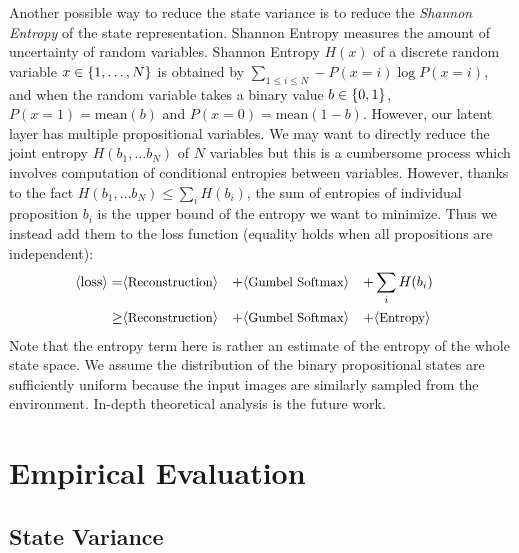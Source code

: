 Another possible way to reduce the state variance is to reduce the
\emph{Shannon Entropy} of the state representation.
Shannon Entropy measures the amount of uncertainty of random variables.
% 
Shannon Entropy $H(x)$ of a discrete random variable $x\in
{\left\{1,\ldots,N\right\}}$ is obtained by $\sum_{1\leq i \leq N} -P(x=i)\log
P(x=i)$, and when the random variable takes a binary value
$b\in{\left\{0,1\right\}}$, $P(x=1)=\text{mean}(b)$ and $P(x=0)=\text{mean}(1-b)$.
% 
However, our latent layer has multiple
propositional variables. 
We may want to directly reduce the joint entropy
$H(b_1,\ldots b_N)$ of $N$ variables but this is a cumbersome process which involves
computation of conditional entropies between variables.
However, thanks to the fact $H(b_1,\ldots b_N) \leq \sum_{i} H(b_i)$,
the sum of entropies of individual proposition $b_i$ is the upper bound of the entropy we want to minimize.
Thus we instead add them to the loss function (equality holds when all propositions are independent):
\begin{align*}
 \brackets{\text{loss}} =    & \brackets{\text{\small Reconstruction}} &+ & \brackets{\text{\small Gumbel Softmax}} &+ & \sum_{i} H(b_i)& \\
                        \geq & \brackets{\text{\small Reconstruction}} &+ & \brackets{\text{\small Gumbel Softmax}} &+ & \brackets{\text{\small Entropy}}
\end{align*}
Note that the entropy term here is rather an estimate of the entropy of the whole state space.
We assume the distribution of the binary propositional states are sufficiently uniform
because the input images are similarly sampled from the environment.
In-depth theoretical analysis is the future work.

\section{Empirical Evaluation}
\label{evaluation}

\subsection{State Variance}

